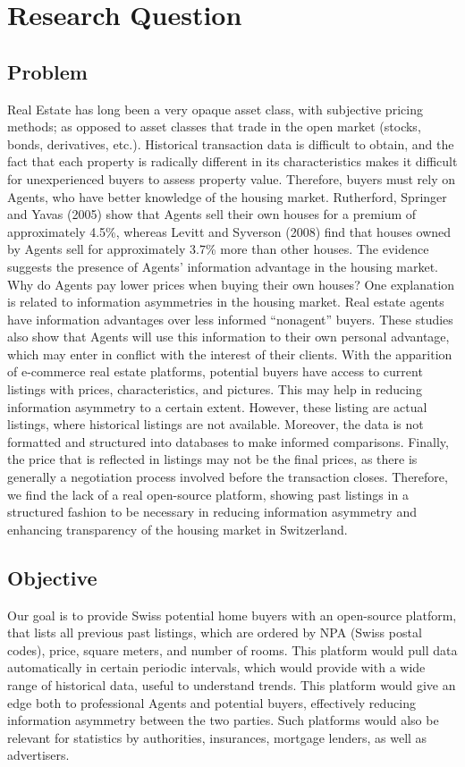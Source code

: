 \documentclass[main]{subfiles}
\begin{document}
\section{Research Question}
\subsection{Problem}
Real Estate has long been a very opaque asset class, with subjective pricing methods; 
as opposed to asset classes that trade in the open market (stocks, bonds, derivatives, etc.). Historical transaction data is difficult to obtain, and the fact that each property is radically different in its characteristics makes it difficult for unexperienced buyers to assess property value. 
Therefore, buyers must rely on Agents, who have better knowledge of the housing market. 
Rutherford, Springer and Yavas (2005)  \cite{rutherfordConflictsPrincipalsAgents2005} show that Agents sell their own houses for a premium of approximately 
4.5\%, whereas Levitt and Syverson (2008) \cite{levittMarketDistortionsWhen2005} find that houses owned by Agents sell for approximately 
3.7\% more than other houses. The evidence suggests the presence of Agents' 
information advantage in the housing market. 
Why do Agents pay lower prices when buying their own houses? One explanation is related to
 information asymmetries in the housing market. Real estate agents have information advantages over less informed “nonagent” buyers. These studies also show that Agents will use this information to their own personal advantage, which may enter in conflict with the interest of their clients.
With the apparition of e-commerce real estate platforms, potential buyers have access to current 
listings with prices, characteristics, and pictures. 
This may help in reducing information asymmetry to a certain extent. However,
 these listing are actual listings, where historical listings are not available. 
 Moreover, the data is not formatted and structured into databases to make informed comparisons. Finally, the price that is reflected in listings may not be the final prices, as there is generally a negotiation process involved before the transaction closes.
Therefore, we find the lack of a real open-source platform, showing past listings in a structured fashion to be necessary in reducing information asymmetry and enhancing transparency of the housing market in Switzerland.

\subsection{Objective}
Our goal is to provide Swiss potential home buyers with an open-source platform, that lists all previous past listings, which are ordered by NPA (Swiss postal codes), price, square meters, and number of rooms. This platform would pull data automatically in certain periodic intervals, which would provide with a wide range of historical data, useful to understand trends. This platform would give an edge both to professional Agents and potential buyers, effectively reducing information asymmetry between the two parties.
Such platforms would also be relevant for statistics by authorities, insurances, mortgage lenders, as well as advertisers.
\end{document}
